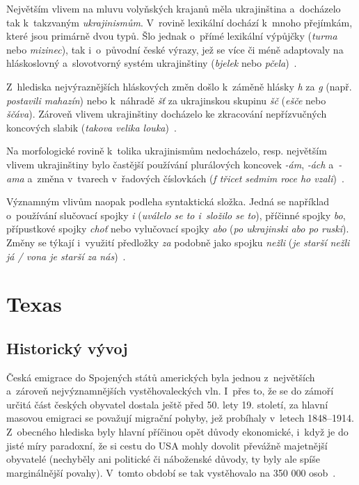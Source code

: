 Největším vlivem na mluvu volyňských krajanů měla ukrajinština a~docházelo tak k~takzvaným \emph{ukrajinismům}. V~rovině lexikální dochází k~mnoho přejímkám, které jsou primárně dvou typů. Šlo jednak o~přímé lexikální výpůjčky (\emph{turma} nebo \emph{mizinec}), tak i~o~původní české výrazy, jež se více či méně adaptovaly na hláskoslovný a~slovotvorný systém ukrajinštiny (\emph{bjelek} nebo \emph{pčela})~\parencite{Balhar2005}.

Z~hlediska nejvýraznějších hláskových změn došlo k~záměně hlásky \emph{h} za \emph{g} (např. \emph{postavili mahazín}) nebo k~náhradě \emph{šť} za ukrajinskou skupinu \emph{šč} (\emph{ešče} nebo \emph{ščáva}). Zároveň vlivem ukrajinštiny docházelo ke zkracování nepřízvučných koncových slabik (\emph{takova velika louka})~\parencite{Jancakova2004}.

Na morfologické rovině k~tolika ukrajinismům nedocházelo, resp. největším vlivem ukrajinštiny bylo častější používání plurálových koncovek \emph{-ám}, \emph{-ách} a~\emph{-ama} a~změna v~tvarech v~řadových číslovkách (\emph{f třicet sedmim roce ho vzali})~\parencite{Jancakova2004}.

Významným vlivům naopak podleha syntaktická složka. Jedná se například o~používání slučovací spojky \emph{i} (\emph{uválelo se to i~složilo se to}), příčinné spojky \emph{bo}, přípustkové spojky \emph{choť} nebo vylučovací spojky \emph{abo} (\emph{po ukrajinski abo po ruski}). Změny se týkají i~využití předložky \emph{za} podobně jako spojku \emph{nežli} (\emph{je starší nežli já / vona je starší za nás})~\parencite{Balhar2005}.

\hypertarget{texas}{%
\section{Texas}\label{texas}}

\hypertarget{historickuxfd-vuxfdvoj-2}{%
\subsection*{Historický vývoj}\label{historickuxfd-vuxfdvoj-2}}

Česká emigrace do Spojených států amerických byla jednou z~největších a~zároveň nejvýznamnějších vystěhovaleckých vln. I~přes to, že se do zámoří určitá část českých obyvatel dostala ještě před 50. lety 19. století, za hlavní masovou emigraci se považují migrační pohyby, jež probíhaly v~letech 1848--1914. Z~obecného hlediska byly hlavní příčinou opět důvody ekonomické, i~když je do jisté míry paradoxní, že si cestu do USA mohly dovolit převážně majetnější obyvatelé (nechyběly ani politické či náboženské důvody, ty byly ale spíše marginálnější povahy). V~tomto období se tak vystěhovalo na 350 000 osob~\parencite{Vaculik2009a}.

